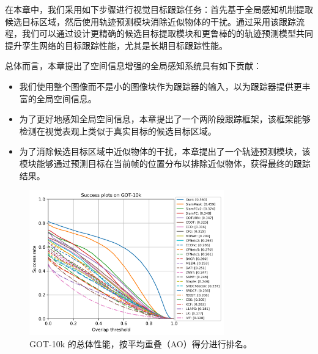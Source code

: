在本章中，我们采用如下步骤进行视觉目标跟踪任务：首先基于全局感知机制提取候选目标区域，然后使用轨迹预测模块消除近似物体的干扰。通过采用该跟踪流程，我们可以通过设计更精确的候选目标提取模块和更鲁棒的的轨迹预测模型共同提升孪生网络的目标跟踪性能，尤其是长期目标跟踪性能。

总体而言，本章提出了空间信息增强的全局感知系统具有如下贡献：
\begin{itemize}
\item 我们使用整个图像而不是小的图像块作为跟踪器的输入，以为跟踪器提供更丰富的全局空间信息。
\item 为了更好地感知全局空间信息，本章提出了一个两阶段跟踪框架，该框架能够检测在视觉表观上类似于真实目标的候选目标区域。
\item 为了消除候选目标区域中近似物体的干扰，本章提出了一个轨迹预测模块，该模块能够通过预测目标在当前帧的位置分布以排除近似物体，获得最终的跟踪结果。
\end{itemize}

\begin{figure}[t]
\centering
    \includegraphics[width=0.75\textwidth]{Img/globally/success_plot.png}
    \caption{GOT-10k 的总体性能，按平均重叠（AO）得分进行排名。}
\end{figure}

